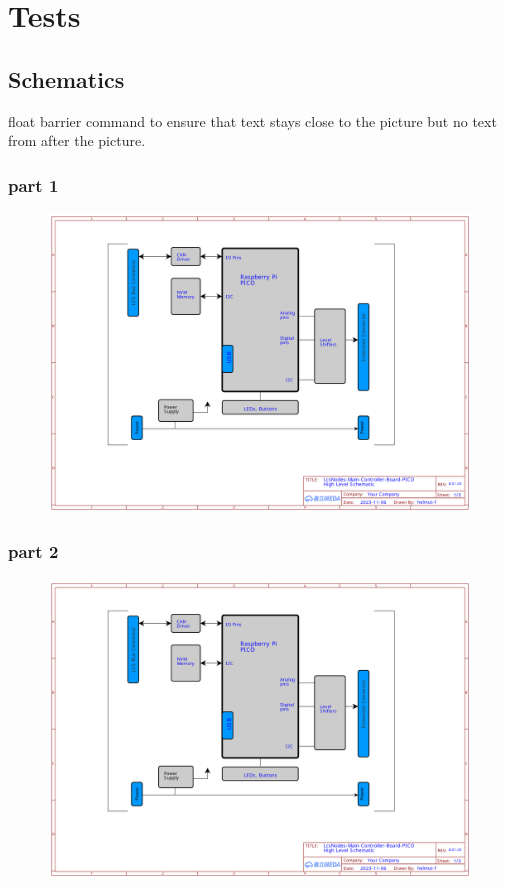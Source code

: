 \chapter{Tests}

\section{Schematics}

float barrier command to ensure that text stays close to the picture but no text from after the picture.

\subsection{part 1}

\begin{figure}[ht]
    \centering
    \includegraphics[page=1, width=\textwidth]{./schematics/Schematic_LcsNodes-Main-Controller-Board-B.01.00.pdf}
\end{figure}

\FloatBarrier

\subsection{part 2}
\begin{figure}[ht]
    \centering
    \includegraphics[page=2, width=\textwidth]{./schematics/Schematic_LcsNodes-Main-Controller-Board-B.01.00.pdf}
\end{figure}

